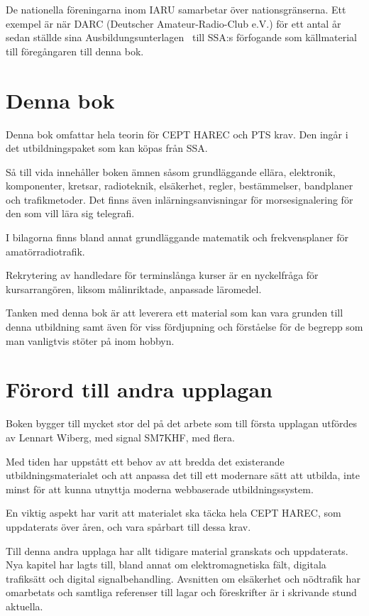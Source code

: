 De nationella föreningarna inom IARU samarbetar över nationsgränserna.
Ett exempel är när DARC (Deutscher Amateur-Radio-Club e.V.) för ett antal år
sedan ställde sina Ausbildungsunterlagen~\cite{DARCaus} till SSA:s förfogande
som källmaterial till föregångaren till denna bok.

\section*{Denna bok}

Denna bok omfattar hela teorin för CEPT HAREC och PTS krav.
Den ingår i det utbildningspaket som kan köpas från SSA.

Så till vida innehåller boken ämnen såsom grundläggande ellära, elektronik,
komponenter, kretsar, radioteknik, elsäkerhet, regler, bestämmelser, bandplaner
och trafikmetoder.
Det finns även inlärningsanvisningar för morsesignalering för den som vill lära
sig telegrafi.

I bilagorna finns bland annat grundläggande matematik
och frekvensplaner för amatörradiotrafik.

Rekrytering av handledare för terminslånga kurser är en nyckelfråga för
kursarrangören, liksom målinriktade, anpassade läromedel.

Tanken med denna bok är att leverera ett material som kan vara grunden till
denna utbildning samt även för viss fördjupning och förståelse för de begrepp
som man vanligtvis stöter på inom hobbyn.

\balance

\section*{Förord till andra upplagan}

Boken bygger till mycket stor del på det arbete som till första upplagan
utfördes av Lennart Wiberg, med signal SM7KHF, med flera.

Med tiden har uppstått ett behov av att bredda det existerande
utbildningsmaterialet och att anpassa det till ett modernare sätt att utbilda,
inte minst för att kunna utnyttja moderna webbaserade utbildningssystem.

En viktig aspekt har varit att materialet ska täcka hela CEPT HAREC,
som uppdaterats över åren, och vara spårbart till dessa krav.

Till denna andra upplaga har allt tidigare material granskats och uppdaterats.
Nya kapitel har lagts till, bland annat om elektromagnetiska fält, digitala
trafiksätt och digital signalbehandling.
Avsnitten om elsäkerhet och nödtrafik har omarbetats och samtliga referenser
till lagar och föreskrifter är i skrivande stund aktuella.

